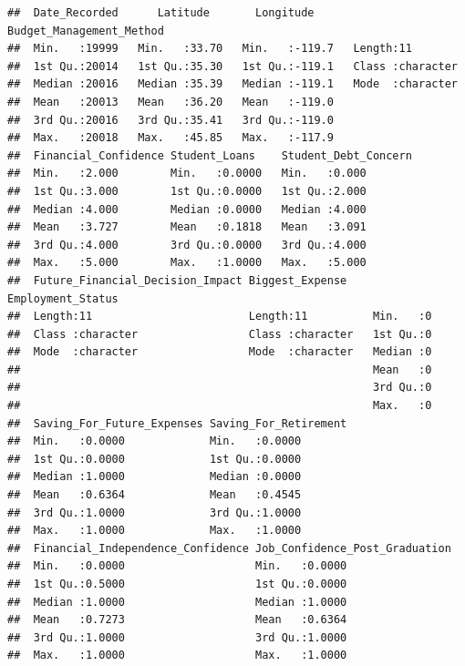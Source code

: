 \documentclass[
]{article}
\begin{document}
\begin{verbatim}
##  Date_Recorded      Latitude       Longitude      Budget_Management_Method
##  Min.   :19999   Min.   :33.70   Min.   :-119.7   Length:11               
##  1st Qu.:20014   1st Qu.:35.30   1st Qu.:-119.1   Class :character        
##  Median :20016   Median :35.39   Median :-119.1   Mode  :character        
##  Mean   :20013   Mean   :36.20   Mean   :-119.0                           
##  3rd Qu.:20016   3rd Qu.:35.41   3rd Qu.:-119.0                           
##  Max.   :20018   Max.   :45.85   Max.   :-117.9                           
##  Financial_Confidence Student_Loans    Student_Debt_Concern
##  Min.   :2.000        Min.   :0.0000   Min.   :0.000       
##  1st Qu.:3.000        1st Qu.:0.0000   1st Qu.:2.000       
##  Median :4.000        Median :0.0000   Median :4.000       
##  Mean   :3.727        Mean   :0.1818   Mean   :3.091       
##  3rd Qu.:4.000        3rd Qu.:0.0000   3rd Qu.:4.000       
##  Max.   :5.000        Max.   :1.0000   Max.   :5.000       
##  Future_Financial_Decision_Impact Biggest_Expense    Employment_Status
##  Length:11                        Length:11          Min.   :0        
##  Class :character                 Class :character   1st Qu.:0        
##  Mode  :character                 Mode  :character   Median :0        
##                                                      Mean   :0        
##                                                      3rd Qu.:0        
##                                                      Max.   :0        
##  Saving_For_Future_Expenses Saving_For_Retirement
##  Min.   :0.0000             Min.   :0.0000       
##  1st Qu.:0.0000             1st Qu.:0.0000       
##  Median :1.0000             Median :0.0000       
##  Mean   :0.6364             Mean   :0.4545       
##  3rd Qu.:1.0000             3rd Qu.:1.0000       
##  Max.   :1.0000             Max.   :1.0000       
##  Financial_Independence_Confidence Job_Confidence_Post_Graduation
##  Min.   :0.0000                    Min.   :0.0000                
##  1st Qu.:0.5000                    1st Qu.:0.0000                
##  Median :1.0000                    Median :1.0000                
##  Mean   :0.7273                    Mean   :0.6364                
##  3rd Qu.:1.0000                    3rd Qu.:1.0000                
##  Max.   :1.0000                    Max.   :1.0000
\end{verbatim}
\end{document}

